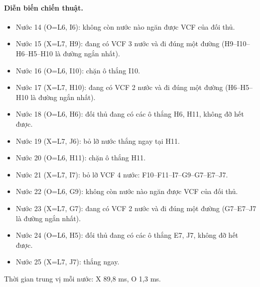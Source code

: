 \paragraph{Diễn biến chiến thuật.}
\begin{itemize}\small
\setlength{\itemsep}{0pt}
  \item Nước 14 (O=L6, I6): không còn nước nào ngăn được VCF của đối thủ.
  \item Nước 15 (X=L7, H9): đang có VCF 3 nước và đi đúng một đường (H9--I10--H6--H5--H10 là đường ngắn nhất).
  \item Nước 16 (O=L6, I10): chặn ô thắng I10.
  \item Nước 17 (X=L7, H10): đang có VCF 2 nước và đi đúng một đường (H6--H5--H10 là đường ngắn nhất).
  \item Nước 18 (O=L6, H6): đối thủ đang có các ô thắng H6, H11, không đỡ hết được.
  \item Nước 19 (X=L7, J6): bỏ lỡ nước thắng ngay tại H11.
  \item Nước 20 (O=L6, H11): chặn ô thắng H11.
  \item Nước 21 (X=L7, I7): bỏ lỡ VCF 4 nước: F10--F11--I7--G9--G7--E7--J7.
  \item Nước 22 (O=L6, G9): không còn nước nào ngăn được VCF của đối thủ.
  \item Nước 23 (X=L7, G7): đang có VCF 2 nước và đi đúng một đường (G7--E7--J7 là đường ngắn nhất).
  \item Nước 24 (O=L6, H5): đối thủ đang có các ô thắng E7, J7, không đỡ hết được.
  \item Nước 25 (X=L7, J7): thắng ngay.
\end{itemize}
Thời gian trung vị mỗi nước: X 89,8 ms, O 1,3 ms.
\clearpage

